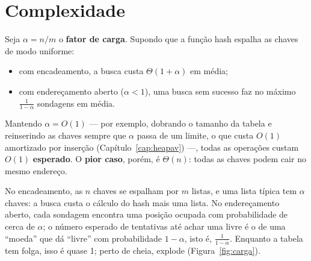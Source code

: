 \section{Complexidade}\label{sec:hashcompl}
Seja $\alpha=n/m$ o \textbf{fator de carga}. Supondo que a função hash espalha as chaves de modo uniforme:
\begin{itemize}
  \item com encadeamento, a busca custa $\Theta(1+\alpha)$ em média;
  \item com endereçamento aberto ($\alpha<1$), uma busca sem sucesso faz no máximo $\frac1{1-\alpha}$ sondagens em média.
\end{itemize}
Mantendo $\alpha=O(1)$ --- por exemplo, dobrando o tamanho da tabela e reinserindo as chaves sempre que $\alpha$ passa de um limite, o que custa $O(1)$ amortizado por inserção (Capítulo~\ref{cap:heapav}) ---, todas as operações custam $O(1)$ \textbf{esperado}. O \textbf{pior caso}, porém, é $\Theta(n)$: todas as chaves podem cair no mesmo endereço.

\begin{intuicao}
No encadeamento, as $n$ chaves se espalham por $m$ listas, e uma lista típica tem $\alpha$ chaves: a busca custa o cálculo do hash mais uma lista. No endereçamento aberto, cada sondagem encontra uma posição ocupada com probabilidade de cerca de $\alpha$; o número esperado de tentativas até achar uma livre é o de uma ``moeda'' que dá ``livre'' com probabilidade $1-\alpha$, isto é, $\frac1{1-\alpha}$. Enquanto a tabela tem folga, isso é quase 1; perto de cheia, explode (Figura~\ref{fig:carga}).
\end{intuicao}

\begin{figura}[O custo médio de uma busca sem sucesso em função do fator de carga $\alpha$: com encadeamento, $1+\alpha$ (cresce devagar e admite $\alpha>1$); com endereçamento aberto, $\frac1{1-\alpha}$ (explode quando a tabela fica cheia). Com $\alpha=0{,}75$, o endereçamento aberto faz em média até 4 sondagens.\label{fig:carga}]
\end{figura}

